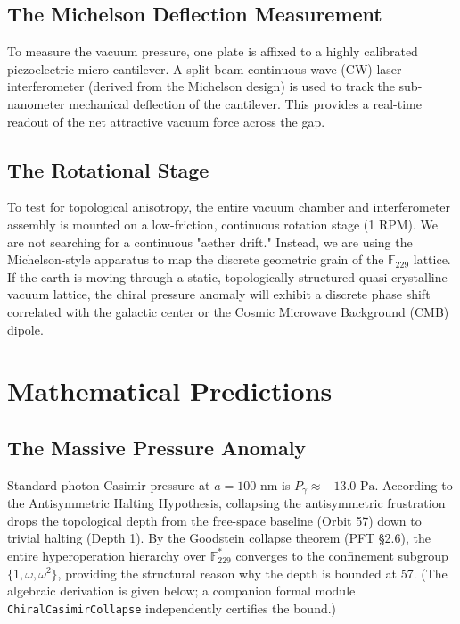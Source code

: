 \subsection{The Michelson Deflection Measurement}\label{sec:michelson}
To measure the vacuum pressure, one plate is affixed to a highly calibrated piezoelectric micro-cantilever. A split-beam continuous-wave (CW) laser interferometer (derived from the Michelson design) is used to track the sub-nanometer mechanical deflection of the cantilever. This provides a real-time readout of the net attractive vacuum force across the gap.

\subsection{The Rotational Stage}\label{sec:rotation}
To test for topological anisotropy, the entire vacuum chamber and interferometer assembly is mounted on a low-friction, continuous rotation stage (1 RPM). We are not searching for a continuous "aether drift." Instead, we are using the Michelson-style apparatus to map the discrete geometric grain of the $\mathbb{F}_{229}$ lattice. If the earth is moving through a static, topologically structured quasi-crystalline vacuum lattice, the chiral pressure anomaly will exhibit a discrete phase shift correlated with the galactic center or the Cosmic Microwave Background (CMB) dipole.

\section{Mathematical Predictions}\label{sec:math}

\subsection{The Massive Pressure Anomaly}\label{sec:anomaly}
Standard photon Casimir pressure at $a = 100\text{ nm}$ is $P_\gamma \approx -13.0\text{ Pa}$. 
According to the Antisymmetric Halting Hypothesis, collapsing the antisymmetric frustration drops the topological depth from the free-space baseline (Orbit 57) down to trivial halting (Depth 1). By the Goodstein collapse theorem (PFT \S2.6), the entire hyperoperation hierarchy over $\mathbb{F}_{229}^*$ converges to the confinement subgroup $\{1, \omega, \omega^2\}$, providing the structural reason why the depth is bounded at 57. (The algebraic derivation is given below; a companion formal module \texttt{ChiralCasimirCollapse} independently certifies the bound.)

